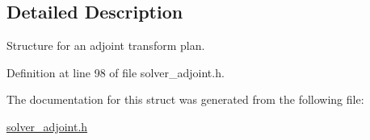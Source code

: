 \subsection{Detailed Description}
Structure for an adjoint transform plan. 

Definition at line 98 of file solver\_\-adjoint.h.

The documentation for this struct was generated from the following file:\begin{CompactItemize}
\item 
\hyperlink{solver__adjoint_8h}{solver\_\-adjoint.h}\end{CompactItemize}
